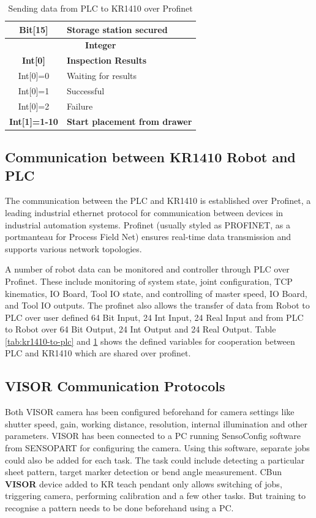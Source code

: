 \begin{table}[h!]
\begin{tabular}{c@{\hskip 2cm}l}
      Bit[15] & Storage station secured\\
      \hline
      \multicolumn{2}{c}{\textbf{Integer}} \\ \hline
      \textbf{Int[0]} & \textbf{Inspection Results}\\
      Int[0]=0 & Waiting for results\\
      Int[0]=1 & Successful\\
      Int[0]=2 & Failure\\
      \textbf{Int[1]=1-10} & \textbf{Start placement from drawer}\\
      \hline
  \end{tabular}
  \caption{Sending data from PLC to KR1410 over Profinet}
  \label{tab:plc-to-kr1410}
\end{table}

\subsection{Communication between KR1410 Robot and PLC}
The communication between the PLC and KR1410 is established over Profinet, a leading industrial ethernet protocol for communication between devices in industrial automation systems. Profinet (usually styled as PROFINET, as a portmanteau for Process Field Net) ensures real-time data transmission and supports various network topologies. \cite{profinet}

A number of robot data can be monitored and controller through PLC over Profinet. These include monitoring of system state, joint configuration,
TCP kinematics, IO Board, Tool IO state, and controlling of master speed, IO Board, and Tool IO outputs. The profinet also allows the transfer of
data from Robot to PLC over user defined 64 Bit Input, 24 Int Input, 24 Real Input and from PLC to Robot over 64 Bit Output, 24 Int Output and 24 Real Output. \cite{kr-profinet} Table \ref{tab:kr1410-to-plc} and \ref{tab:plc-to-kr1410} shows the defined variables for cooperation between PLC and KR1410 which are shared over profinet.


\subsection{VISOR Communication Protocols}
Both VISOR camera has been configured beforehand for camera settings like shutter speed, gain, working distance, resolution, internal illumination and other parameters. VISOR has been connected to a PC running SensoConfig software from SENSOPART for configuring the camera.
Using this software, separate jobs could also be added for each task. The task could include detecting a particular sheet pattern, target marker detection or bend angle measurement. CBun \textbf{VISOR} device added to KR teach pendant only allows switching of jobs, triggering camera,
performing calibration and a few other tasks. But training to recognise a pattern needs to be done beforehand using a PC.

